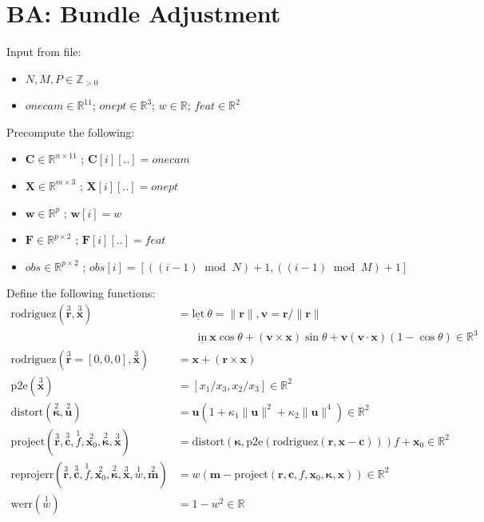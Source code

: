 \documentclass[11pt]{article}
\newcommand\R{\mathbb R}
\newcommand\Z{\mathbb Z}
\renewcommand\mod{\;\mathop{\mathrm{mod}}\;}
\begin{document}
\newpage

\section{BA: Bundle Adjustment}

Input from file:
\begin{itemize}
\item $N, M, P \in \Z_{>0}$
\item $\mathit{onecam} \in \R^{11}$;
	$\mathit{onept} \in \R^3$;
	$w \in \R$;
	$\mathit{feat} \in \R^2$
\end{itemize}

Precompute the following:
\begin{itemize}
\item $\bm{C} \in \R^{n \times 11}$ ;
		$\bm{C}[i][..] = \mathit{onecam}$
\item $\bm{X} \in \R^{m \times 3}$ ;
		$\bm{X}[i][..] = \mathit{onept}$
\item $\bm{w} \in \R^p$ ;
		$\bm{w}[i] = w$
\item $\bm{F} \in \R^{p \times 2}$ ;
		$\bm{F}[i][..] = \mathit{feat}$
\item $\mathit{obs} \in \R^{p \times 2}$ ;
		$\mathit{obs}[i] = [((i - 1) \mod N) + 1, ((i - 1) \mod M) + 1]$
\end{itemize}

Define the following functions:
\begin{align*}
\mathrm{rodriguez}(\overset3{\bm{r}}, \overset3{\bm{x}}) &=
	\mathrm{\underline{let}}\ \theta = \lVert \bm{r} \rVert,
					\bm{v} = \bm{r} / \lVert \bm{r} \rVert \\
	&\phantom{=}\;\ \mathrm{\underline{in}}\ \bm{x} \cos \theta + (\bm{v} \times \bm{x}) \sin \theta + \bm{v} (\bm{v} \cdot \bm{x}) (1 - \cos \theta) \in \R^3 \\
\mathrm{rodriguez}(\overset3{\bm{r}}=[0,0,0], \overset3{\bm{x}}) &=
	\bm{x} + (\bm{r} \times \bm{x}) \\
\mathrm{p2e}(\overset3{\bm{x}}) &=
	[x_1 / x_3, x_2 / x_3] \in \R^2 \\
\mathrm{distort}(\overset2{\bm{\kappa}}, \overset2{\bm{u}}) &=
	\bm{u}(1 + \kappa_1 \lVert \bm{u} \rVert^2 + \kappa_2 \lVert \bm{u} \rVert^4) \in \R^2 \\
\mathrm{project}(\overset3{\bm{r}}, \overset3{\bm{c}}, \overset1f, \overset2{\bm{x}_0}, \overset2{\bm{\kappa}}, \overset3{\bm{x}}) &=
	\mathrm{distort}(\bm{\kappa}, \mathrm{p2e}(\mathrm{rodriguez}(\bm{r}, \bm{x} - \bm{c}))) f + \bm{x}_0 \in \R^2 \\
\mathrm{reprojerr}(\overset3{\bm{r}}, \overset3{\bm{c}}, \overset1f, \overset2{\bm{x}_0}, \overset2{\bm{\kappa}}, \overset3{\bm{x}}, \overset1w, \overset2{\bm{m}}) &=
	w(\bm{m} - \mathrm{project}(\bm{r}, \bm{c}, f, \bm{x}_0, \bm{\kappa}, \bm{x})) \in \R^2 \\
\mathrm{werr}(\overset1w) &=
	1 - w^2 \in \R
\end{align*}
\end{document}
